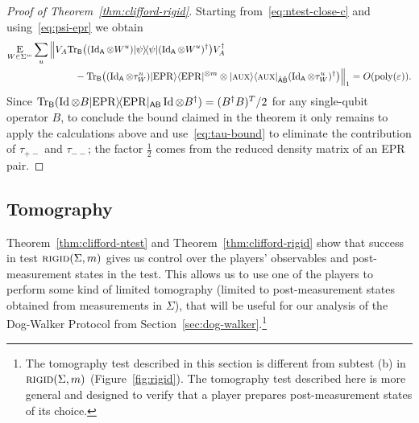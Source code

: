 \begin{proof}[Proof of Theorem~\ref{thm:clifford-rigid}]
Starting from~\eqref{eq:ntest-close-c} and using~\eqref{eq:psi-epr} we obtain 
\begin{align*}\mathop{\textsc{E}}_{W\in\Sigma^{m}}\sum_{u} \Big\|& V_A\mbox{\rm Tr}_{\textsf{B}}\big( (\mathop{\rm Id}\nolimits_{\textsf{A}} \otimes W^{u})|\psi\rangle\!\langle\psi|(\mathop{\rm Id}\nolimits_{\textsf{A}} \otimes W^{u})^\dagger \big) V_A^\dagger \\
&\qquad- \mbox{\rm Tr}_{\textsf{B}}\big( (\mathop{\rm Id}\nolimits_{\textsf{A}} \otimes \tau_W^{u})|{\rm EPR}\rangle\langle{\rm EPR}|^{\otimes m} \otimes |\textsc {aux}\rangle\langle\textsc {aux}|_{\hat{{\textsf{A}}}\hat{{\textsf{B}}}}(\mathop{\rm Id}\nolimits_{\textsf{A}} \otimes \tau_W^{u})^\dagger \big) \Big\|_1 = O(\operatorname{poly}(\varepsilon)).
\end{align*}
Since $\mbox{\rm Tr}_{{\textsf{B}}}( \mathop{\rm Id}\nolimits \otimes B |{\rm EPR}\rangle\!\langle{\rm EPR}|_{{\textsf{AB}}} \mathop{\rm Id}\nolimits\otimes B^\dagger) = (B^\dagger B)^T/2$ for any single-qubit operator $B$, to conclude the bound claimed in the theorem it only remains to apply the calculations above and use~\eqref{eq:tau-bound} to eliminate the contribution of $\tau_{+-}$ and $\tau_{--}$; the factor $\frac{1}{2}$ comes from the reduced density matrix of an EPR pair.
\end{proof}


\subsection{Tomography}
\label{subsec:tomography}
\label{sec: TOM test}

Theorem~\ref{thm:clifford-ntest} and Theorem~\ref{thm:clifford-rigid} show that success in test $\textsc{rigid}(\Sigma,m)$ gives us control over the players' observables and post-measurement states in the test. This allows us to use one of the players to perform some kind of limited tomography (limited to post-measurement states obtained from measurements in $\Sigma$), that will be useful for our analysis of the Dog-Walker Protocol from Section~\ref{sec:dog-walker}.\footnote{The tomography test described in this section is different from subtest (b) in $\textsc{rigid}(\Sigma,m)$ (Figure~\ref{fig:rigid}). The tomography test described here is more general and designed to verify that a player prepares post-measurement states of its choice.}

